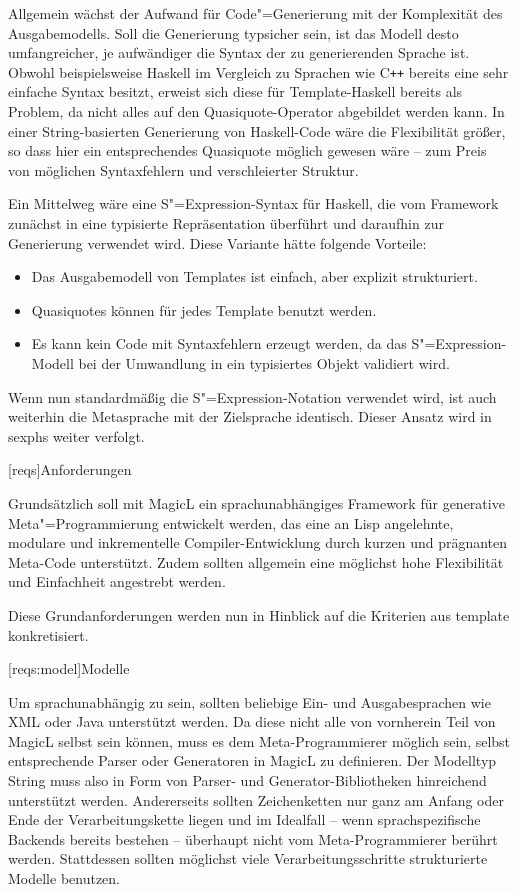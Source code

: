 \documentclass[12pt, a4paper, bibgerm]{scrbook}
\newcommand\lchapter{}
\newcommand\lsection{}
\newcommand\cref{}
\newcommand{\sexp}{S"=Expression}
\newcommand{\cgen}{Code"=Generierung}
\newcommand{\mprog}{Meta"=Programmierung}
\newcommand{\cpp}{C\texttt{++}}
\begin{document}
Allgemein wächst der Aufwand für \cgen{} mit der Komplexität des
Ausgabemodells. Soll die Generierung typsicher sein, ist das Modell
desto umfangreicher, je aufwändiger die Syntax der zu generierenden
Sprache ist. Obwohl beispielsweise Haskell im Vergleich zu Sprachen wie
\cpp{} bereits eine sehr einfache Syntax besitzt, erweist sich diese für
Template-Haskell bereits als Problem, da nicht alles auf den
Quasiquote-Operator abgebildet werden kann. In einer String-basierten
Generierung von Haskell-Code wäre die Flexibilität größer, so dass hier
ein entsprechendes Quasiquote möglich gewesen wäre -- zum Preis von
möglichen Syntaxfehlern und verschleierter Struktur.

Ein Mittelweg wäre eine \sexp{}-Syntax für Haskell, die vom Framework
zunächst in eine typisierte Repräsentation überführt und daraufhin zur
Generierung verwendet wird. Diese Variante hätte folgende Vorteile:
\begin{itemize}
\item Das Ausgabemodell von Templates ist einfach, aber explizit
  strukturiert.
\item Quasiquotes können für jedes Template benutzt werden.
\item Es kann kein Code mit Syntaxfehlern erzeugt werden, da das
  \sexp{}-Modell bei der Umwandlung in ein typisiertes Objekt
  validiert wird.
\end{itemize}
Wenn nun standardmäßig die \sexp{}-Notation verwendet wird, ist auch
weiterhin die Metasprache mit der Zielsprache identisch. Dieser Ansatz
wird in \cref{sexphs} weiter verfolgt.

\lchapter[reqs]{Anforderungen}

Grundsätzlich soll mit MagicL ein sprachunabhängiges Framework für
generative \mprog{} entwickelt werden, das eine an Lisp angelehnte,
modulare und inkrementelle Compiler-Entwicklung durch kurzen und
prägnanten Meta-Code unterstützt. Zudem sollten allgemein eine möglichst
hohe Flexibilität und Einfachheit angestrebt werden.

Diese Grundanforderungen werden nun in Hinblick auf die Kriterien aus
\cref{template} konkretisiert.

\lsection[reqs:model]{Modelle}

Um sprachunabhängig zu sein, sollten beliebige Ein- und Ausgabesprachen
wie XML oder Java unterstützt werden. Da diese nicht alle von vornherein
Teil von MagicL selbst sein können, muss es dem Meta-Programmierer
möglich sein, selbst entsprechende Parser oder Generatoren in MagicL zu
definieren. Der Modelltyp String muss also in Form von Parser- und
Generator-Bibliotheken hinreichend unterstützt werden. Andererseits
sollten Zeichenketten nur ganz am Anfang oder Ende der
Verarbeitungskette liegen und im Idealfall -- wenn sprachspezifische
Backends bereits bestehen -- überhaupt nicht vom Meta-Programmierer
berührt werden. Stattdessen sollten möglichst viele
Verarbeitungsschritte strukturierte Modelle benutzen. 
\end{document}
